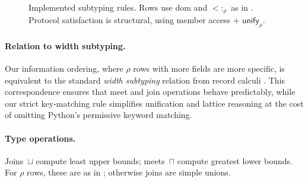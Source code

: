 \begin{figure}[t]
\centering
{}

\caption{Implemented subtyping rules. Rows use $\mathrm{dom}$ and $<:_\rho$ as in . Protocol satisfaction is structural, using member access + $\mathsf{unify}_{\rho}$.}
\label{fig:subtyping}
\end{figure}

\paragraph{Relation to width subtyping.}
Our information ordering, where $\rho$ rows with more fields are more specific, is
equivalent to the standard \emph{width subtyping} relation from record calculi
. This correspondence ensures that meet and join operations
behave predictably, while our strict key-matching rule simplifies unification and
lattice reasoning at the cost of omitting Python’s permissive keyword matching.

\paragraph{Type operations.}  
Joins~$\sqcup$ compute least upper bounds; meets~$\sqcap$ compute greatest lower bounds.  
For $\rho$ rows, these are as in ; otherwise joins are simple unions.

